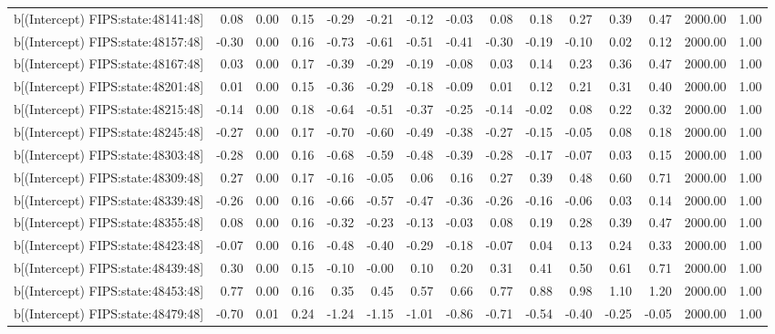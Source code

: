 \begin{table}[ht]
\begin{tabular}{rrrrrrrrrrrrrrr}
  b[(Intercept) FIPS:state:48141:48] & 0.08 & 0.00 & 0.15 & -0.29 & -0.21 & -0.12 & -0.03 & 0.08 & 0.18 & 0.27 & 0.39 & 0.47 & 2000.00 & 1.00 \\ 
  b[(Intercept) FIPS:state:48157:48] & -0.30 & 0.00 & 0.16 & -0.73 & -0.61 & -0.51 & -0.41 & -0.30 & -0.19 & -0.10 & 0.02 & 0.12 & 2000.00 & 1.00 \\ 
  b[(Intercept) FIPS:state:48167:48] & 0.03 & 0.00 & 0.17 & -0.39 & -0.29 & -0.19 & -0.08 & 0.03 & 0.14 & 0.23 & 0.36 & 0.47 & 2000.00 & 1.00 \\ 
  b[(Intercept) FIPS:state:48201:48] & 0.01 & 0.00 & 0.15 & -0.36 & -0.29 & -0.18 & -0.09 & 0.01 & 0.12 & 0.21 & 0.31 & 0.40 & 2000.00 & 1.00 \\ 
  b[(Intercept) FIPS:state:48215:48] & -0.14 & 0.00 & 0.18 & -0.64 & -0.51 & -0.37 & -0.25 & -0.14 & -0.02 & 0.08 & 0.22 & 0.32 & 2000.00 & 1.00 \\ 
  b[(Intercept) FIPS:state:48245:48] & -0.27 & 0.00 & 0.17 & -0.70 & -0.60 & -0.49 & -0.38 & -0.27 & -0.15 & -0.05 & 0.08 & 0.18 & 2000.00 & 1.00 \\ 
  b[(Intercept) FIPS:state:48303:48] & -0.28 & 0.00 & 0.16 & -0.68 & -0.59 & -0.48 & -0.39 & -0.28 & -0.17 & -0.07 & 0.03 & 0.15 & 2000.00 & 1.00 \\ 
  b[(Intercept) FIPS:state:48309:48] & 0.27 & 0.00 & 0.17 & -0.16 & -0.05 & 0.06 & 0.16 & 0.27 & 0.39 & 0.48 & 0.60 & 0.71 & 2000.00 & 1.00 \\ 
  b[(Intercept) FIPS:state:48339:48] & -0.26 & 0.00 & 0.16 & -0.66 & -0.57 & -0.47 & -0.36 & -0.26 & -0.16 & -0.06 & 0.03 & 0.14 & 2000.00 & 1.00 \\ 
  b[(Intercept) FIPS:state:48355:48] & 0.08 & 0.00 & 0.16 & -0.32 & -0.23 & -0.13 & -0.03 & 0.08 & 0.19 & 0.28 & 0.39 & 0.47 & 2000.00 & 1.00 \\ 
  b[(Intercept) FIPS:state:48423:48] & -0.07 & 0.00 & 0.16 & -0.48 & -0.40 & -0.29 & -0.18 & -0.07 & 0.04 & 0.13 & 0.24 & 0.33 & 2000.00 & 1.00 \\ 
  b[(Intercept) FIPS:state:48439:48] & 0.30 & 0.00 & 0.15 & -0.10 & -0.00 & 0.10 & 0.20 & 0.31 & 0.41 & 0.50 & 0.61 & 0.71 & 2000.00 & 1.00 \\ 
  b[(Intercept) FIPS:state:48453:48] & 0.77 & 0.00 & 0.16 & 0.35 & 0.45 & 0.57 & 0.66 & 0.77 & 0.88 & 0.98 & 1.10 & 1.20 & 2000.00 & 1.00 \\ 
  b[(Intercept) FIPS:state:48479:48] & -0.70 & 0.01 & 0.24 & -1.24 & -1.15 & -1.01 & -0.86 & -0.71 & -0.54 & -0.40 & -0.25 & -0.05 & 2000.00 & 1.00 \\ 

\end{tabular}
\end{table}
